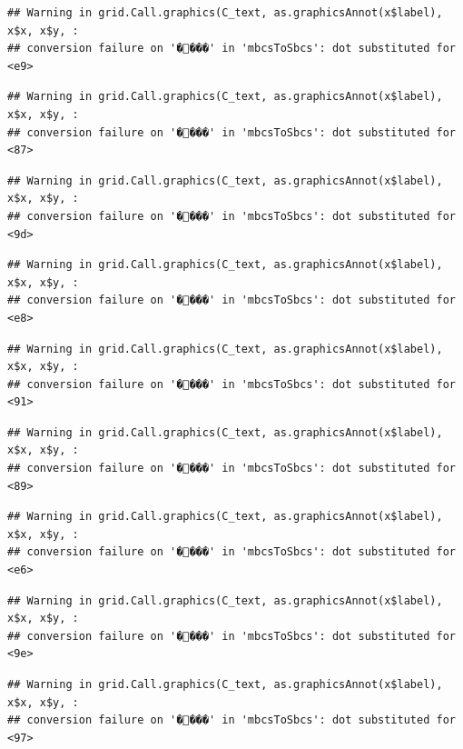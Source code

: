 \documentclass[
]{article}
\begin{document}
\begin{verbatim}
## Warning in grid.Call.graphics(C_text, as.graphicsAnnot(x$label), x$x, x$y, :
## conversion failure on '����' in 'mbcsToSbcs': dot substituted for <e9>
\end{verbatim}

\begin{verbatim}
## Warning in grid.Call.graphics(C_text, as.graphicsAnnot(x$label), x$x, x$y, :
## conversion failure on '����' in 'mbcsToSbcs': dot substituted for <87>
\end{verbatim}

\begin{verbatim}
## Warning in grid.Call.graphics(C_text, as.graphicsAnnot(x$label), x$x, x$y, :
## conversion failure on '����' in 'mbcsToSbcs': dot substituted for <9d>
\end{verbatim}

\begin{verbatim}
## Warning in grid.Call.graphics(C_text, as.graphicsAnnot(x$label), x$x, x$y, :
## conversion failure on '����' in 'mbcsToSbcs': dot substituted for <e8>
\end{verbatim}

\begin{verbatim}
## Warning in grid.Call.graphics(C_text, as.graphicsAnnot(x$label), x$x, x$y, :
## conversion failure on '����' in 'mbcsToSbcs': dot substituted for <91>
\end{verbatim}

\begin{verbatim}
## Warning in grid.Call.graphics(C_text, as.graphicsAnnot(x$label), x$x, x$y, :
## conversion failure on '����' in 'mbcsToSbcs': dot substituted for <89>
\end{verbatim}

\begin{verbatim}
## Warning in grid.Call.graphics(C_text, as.graphicsAnnot(x$label), x$x, x$y, :
## conversion failure on '����' in 'mbcsToSbcs': dot substituted for <e6>
\end{verbatim}

\begin{verbatim}
## Warning in grid.Call.graphics(C_text, as.graphicsAnnot(x$label), x$x, x$y, :
## conversion failure on '����' in 'mbcsToSbcs': dot substituted for <9e>
\end{verbatim}

\begin{verbatim}
## Warning in grid.Call.graphics(C_text, as.graphicsAnnot(x$label), x$x, x$y, :
## conversion failure on '����' in 'mbcsToSbcs': dot substituted for <97>
\end{verbatim}
\end{document}
